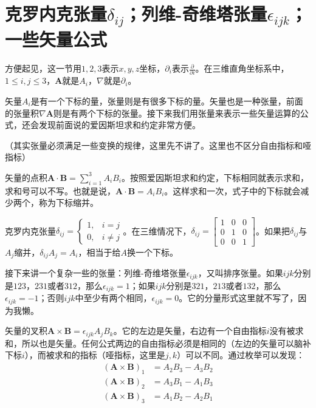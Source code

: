 \section{克罗内克张量$\delta_{i j}$；列维-奇维塔张量$\epsilon_{i j k}$；一些矢量公式}
方便起见，这一节用$1,2,3$表示$x,y,z$坐标，$\partial_i$表示$\frac{\partial}{\partial i}$。在三维直角坐标系中，$1 \le i,j \le 3$，$\mathbf{A}$就是$A_i$，$\nabla$就是$\partial_i$。

矢量$A_i$是有一个下标的量，张量则是有很多下标的量。矢量也是一种张量，前面的张量积$\nabla \mathbf{A}$则是有两个下标的张量。接下来我们用张量来表示一些矢量运算的公式，还会发现前面说的爱因斯坦求和约定非常方便。

（其实张量必须满足一些变换的规律，这里先不讲了。这里也不区分自由指标和哑指标）

矢量的点积$\mathbf{A} \cdot \mathbf{B}=\sum_{i=1}^3 A_i B_i$。按照爱因斯坦求和约定，下标相同就表示求和，求和号可以不写。也就是说，$\mathbf{A} \cdot \mathbf{B}=A_i B_i$。这样求和一次，式子中的下标就会减少两个，称为下标缩并。

克罗内克张量$\delta_{i j}=\begin{cases} 1, &i=j \\ 0, &i \neq j \end{cases}$。在三维情况下，$\delta_{i j}=\begin{bmatrix}
1 & 0 & 0 \\
0 & 1 & 0 \\
0 & 0 & 1
\end{bmatrix}$。如果把$\delta_{i j}$与$A_j$缩并，$\delta_{i j} A_j=A_i$，相当于给$A$换一个下标。

接下来讲一个复杂一些的张量：列维-奇维塔张量$\epsilon_{i j k}$，又叫排序张量。如果$ijk$分别是$123$，$231$或者$312$，那么$\epsilon_{i j k}=1$；如果$ijk$分别是$321$，$213$或者$132$，那么$\epsilon_{i j k}=-1$；否则$ijk$中至少有两个相同，$\epsilon_{i j k}=0$。它的分量形式这里就不写了，因为我懒。

矢量的叉积$\mathbf{A} \times \mathbf{B}=\epsilon_{i j k} A_j B_k$。它的左边是矢量，右边有一个自由指标$i$没有被求和，所以也是矢量。任何公式两边的自由指标必须是相同的（左边的矢量可以脑补下标$i$），而被求和的指标（哑指标，这里是$j,k$）可以不同。通过枚举可以发现：
\begin{align*}
(\mathbf{A} \times \mathbf{B})_1&=A_2 B_3-A_3 B_2 \\
(\mathbf{A} \times \mathbf{B})_2&=A_3 B_1-A_1 B_3 \\
(\mathbf{A} \times \mathbf{B})_3&=A_1 B_2-A_2 B_1
\end{align*}

